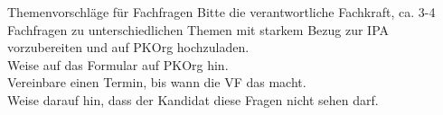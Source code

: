 \begin{taskitem}{Themenvorschläge für Fachfragen}
  Bitte die verantwortliche Fachkraft, ca. 3-4 Fachfragen zu unterschiedlichen Themen mit starkem Bezug zur IPA vorzubereiten und auf PKOrg hochzuladen.\\Weise auf das Formular auf PKOrg hin.\\Vereinbare einen Termin, bis wann die VF das macht.\\Weise darauf hin, dass der Kandidat diese Fragen nicht sehen darf.
\end{taskitem}
